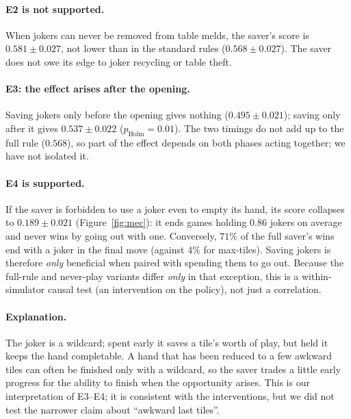 \documentclass[11pt]{article}
\begin{document}
\paragraph{E2 is not supported.} When jokers can never be removed from table melds, the saver's score is $0.581\pm0.027$, not lower than in the standard rules ($0.568\pm0.027$). The saver does not owe its edge to joker recycling or table theft.
\paragraph{E3: the effect arises after the opening.} Saving jokers only before the opening gives nothing ($0.495\pm0.021$); saving only after it gives $0.537\pm0.022$ ($p_{\text{Holm}}=0.01$). The two timings do not add up to the full rule ($0.568$), so part of the effect depends on both phases acting together; we have not isolated it.
\paragraph{E4 is supported.} If the saver is forbidden to use a joker even to empty its hand, its score collapses to $0.189\pm0.021$ (Figure~\ref{fig:mec}): it ends games holding $0.86$ jokers on average and never wins by going out with one. Conversely, $71\%$ of the full saver's wins end with a joker in the final move (against $4\%$ for max-tiles). Saving jokers is therefore \emph{only} beneficial when paired with spending them to go out. Because the full-rule and never-play variants differ \emph{only} in that exception, this is a within-simulator causal test (an intervention on the policy), not just a correlation.

\paragraph{Explanation.} The joker is a wildcard; spent early it saves a tile's worth of play, but held it keeps the hand completable. A hand that has been reduced to a few awkward tiles can often be finished only with a wildcard, so the saver trades a little early progress for the ability to finish when the opportunity arises. This is our interpretation of E3--E4; it is consistent with the interventions, but we did not test the narrower claim about ``awkward last tiles''.
\end{document}
